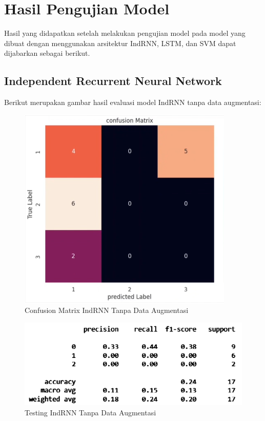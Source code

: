 \section{Hasil Pengujian Model}

Hasil yang didapatkan setelah melakukan pengujian model pada model yang dibuat dengan menggunakan
arsitektur IndRNN, LSTM, dan SVM dapat dijabarkan sebagai berikut.

\subsection{Independent Recurrent Neural Network}

Berikut merupakan gambar hasil evaluasi model IndRNN tanpa data augmentasi:
\newpage
\begin{figure} [ht] \centering
  \includegraphics[scale=1.3]{gambar/CMIndRNNnoaug2.png}
  \caption{Confusion Matrix IndRNN Tanpa Data Augmentasi}
  \label{fig:CMIndRNNnoaug2}
\end{figure}

\begin{figure} [ht] \centering
  \includegraphics[scale=0.55]{gambar/scoreIndRNNnoaug2.png}
  \caption{Testing IndRNN Tanpa Data Augmentasi}
  \label{fig:ScoreIndRNNnoaug2}
\end{figure}

